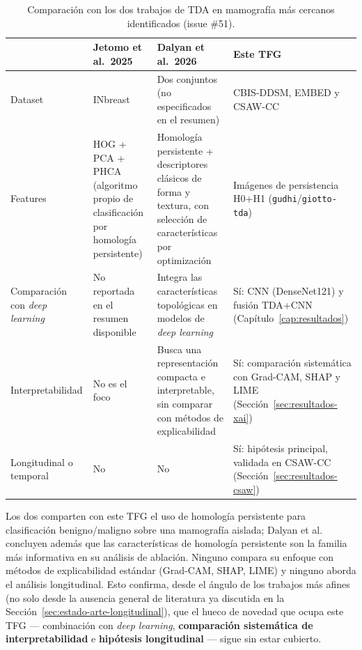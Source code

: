 \begin{table}[H]
\centering
\caption{Comparación con los dos trabajos de TDA en mamografía más cercanos
identificados (issue \#51).}
\label{tab:novedad-jetomo-epj}
\small
\begin{tabular}{@{}>{\raggedright}p{2.8cm}>{\raggedright}p{3.4cm}>{\raggedright}p{3.4cm}>{\raggedright\arraybackslash}p{4.4cm}@{}}
\toprule
 & \textbf{Jetomo et al.\ 2025}~\cite{jetomo2025phca} & \textbf{Dalyan et al.\ 2026}~\cite{hitit2026epjplus} & \textbf{Este TFG} \\
\midrule
Dataset & INbreast & Dos conjuntos (no especificados en el resumen) & CBIS-DDSM, EMBED y CSAW-CC \\
Features & HOG + PCA + PHCA (algoritmo propio de clasificación por homología persistente) & Homología persistente + descriptores clásicos de forma y textura, con selección de características por optimización & Imágenes de persistencia H0+H1 (\texttt{gudhi}/\texttt{giotto-tda}) \\
Comparación con \textit{deep learning} & No reportada en el resumen disponible & Integra las características topológicas en modelos de \textit{deep learning} & Sí: CNN (DenseNet121) y fusión TDA+CNN (Capítulo~\ref{cap:resultados}) \\
Interpretabilidad & No es el foco & Busca una representación compacta e interpretable, sin comparar con métodos de explicabilidad & Sí: comparación sistemática con Grad-CAM, SHAP y LIME (Sección~\ref{sec:resultados-xai}) \\
Longitudinal o temporal & No & No & Sí: hipótesis principal, validada en CSAW-CC (Sección~\ref{sec:resultados-csaw}) \\
\bottomrule
\end{tabular}
\end{table}

Los dos comparten con este TFG el uso de homología persistente para
clasificación benigno/maligno sobre una mamografía aislada; Dalyan et al.
concluyen además que las características de homología persistente son la
familia más informativa en su análisis de ablación. Ninguno compara su
enfoque con métodos de explicabilidad estándar (Grad-CAM, SHAP, LIME) y
ninguno aborda el análisis longitudinal.
Esto confirma, desde el ángulo de los trabajos más afines (no solo desde la
ausencia general de literatura ya discutida en la
Sección~\ref{sec:estado-arte-longitudinal}), que el hueco de novedad que
ocupa este TFG --- combinación con \textit{deep learning},
\textbf{comparación sistemática de interpretabilidad} e
\textbf{hipótesis longitudinal} --- sigue sin estar cubierto.


